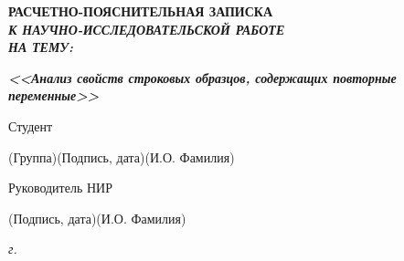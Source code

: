 \documentclass[14pt, russian]{scrartcl}
\begin{document}
\sloppy

\def\figurename{Рисунок}

\begin{titlepage}
\thispagestyle{empty}
\newpage

\bmstuheader

\vspace{3em}

\begin{center}
\Large \bf{РАСЧЕТНО-ПОЯСНИТЕЛЬНАЯ ЗАПИСКА\\\textbf{\textit{К НАУЧНО-ИССЛЕДОВАТЕЛЬСКОЙ РАБОТЕ\\НА ТЕМУ:}} \\}
\end{center}

\vspace*{-6ex}
\begin{center}
\Large{\textit{\textbf{<<Анализ свойств строковых образцов, содержащих повторные переменные>>}}}

\end{center}

\vspace{\fill}

\newlength{\ML}

\noindent Студент \underline{\hspace{1.5cm}} \hfill \underline{\hspace{4cm}}\quad
\underline{\hspace{4cm}}

\vspace{-2.1ex}
\noindent\hspace{9ex}\scriptsize{(Группа)}\normalsize\hspace{170pt}\hspace{2ex}\scriptsize{(Подпись, дата)}\normalsize\hspace{30pt}\hspace{6ex}\scriptsize{(И.О. Фамилия)}\normalsize

\bigskip

\noindent Руководитель НИР \hfill \underline{\hspace{4cm}}\quad
\underline{\hspace{4cm}}

\vspace{-2ex}
\noindent\hspace{13.5ex}\normalsize\hspace{170pt}\hspace{2ex}\scriptsize{(Подпись, дата)}\normalsize\hspace{30pt}\hspace{6ex}\scriptsize{(И.О. Фамилия)}\normalsize
\vfill

\begin{center}
\textsl{\the\year{} г.}
\end{center}
\end{titlepage}
\end{document}
